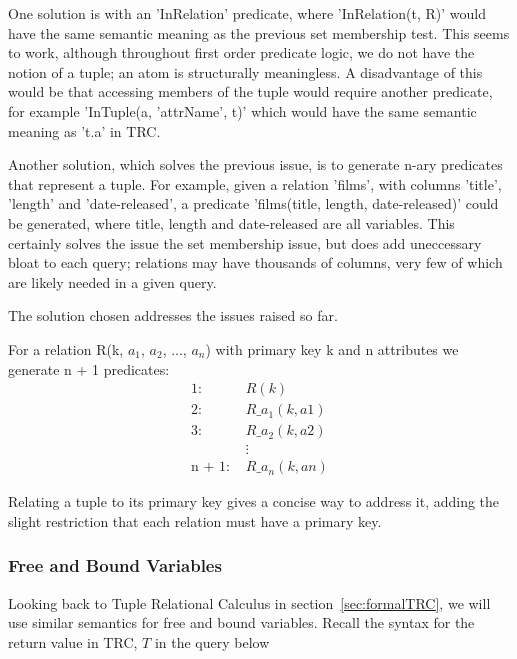 \documentclass[a4paper, 11pt]{article}
\begin{document}
      One solution is with an 'InRelation' predicate, where 'InRelation(t, R)'
      would have the same semantic meaning as the previous set membership test.
      This seems to work, although throughout first order predicate logic, we
      do not have the notion of a tuple; an atom is structurally meaningless. A
      disadvantage of this would be that accessing members of the tuple would
      require another predicate, for example 'InTuple(a, 'attrName', t)' which
      would have the same semantic meaning as 't.a' in TRC.

      Another solution, which solves the previous issue, is to generate n-ary
      predicates that represent a tuple. For example, given a relation 'films',
      with columns 'title', 'length' and 'date-released', a predicate
      'films(title, length, date-released)' could be generated, where title,
      length and date-released are all variables. This certainly solves the
      issue the set membership issue, but does add uneccessary bloat to each
      query; relations may have thousands of columns, very few of which are
      likely needed in a given query.

      The solution chosen addresses the issues raised so far.

      For a relation R(k, $a_{1}$, $a_{2}$, ..., $a_{n}$) with primary key k
      and n attributes we generate n + 1 predicates:
      \begin{align*}
        \text{1:  }     & R(k)            \\
        \text{2:  }     & R\_a_1(k, a1)   \\
        \text{3:  }     & R\_a_2(k, a2)   \\
                        & \vdots          \\
        \text{n + 1:  }  & R\_a_n(k, an)
      \end{align*}

      Relating a tuple to its primary key gives a concise way to address it,
      adding the slight restriction that each relation must have a primary key.

    \subsubsection{Free and Bound Variables}

      Looking back to Tuple Relational Calculus in
      section~\ref{sec:formalTRC}, we will use similar semantics for free and
      bound variables. Recall the syntax for the return value in TRC, $T$ in the
      query below
\end{document}
